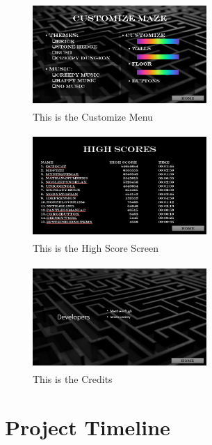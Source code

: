 \documentclass[10pt,conference,onecolumn,compsoc]{IEEEtran}
\begin{document}
\begin{figure}[ht!]
\includegraphics[height=150px, width=250px]{Interface-Customize.png}
\caption{This is the Customize Menu}
\label{Customize Menu}
\end{figure}
\begin{figure}[ht!]
\includegraphics[height=150px, width=250px]{Interface-HighScores.png}
\caption{This is the High Score Screen}
\label{High Scores}
\end{figure}
\begin{figure}[ht!]
\includegraphics[height=150px, width=250px]{Interface-Credits.png}
\caption{This is the Credits}
\label{Credits}
\end{figure}
\clearpage
\section{Project Timeline}
\end{document}
